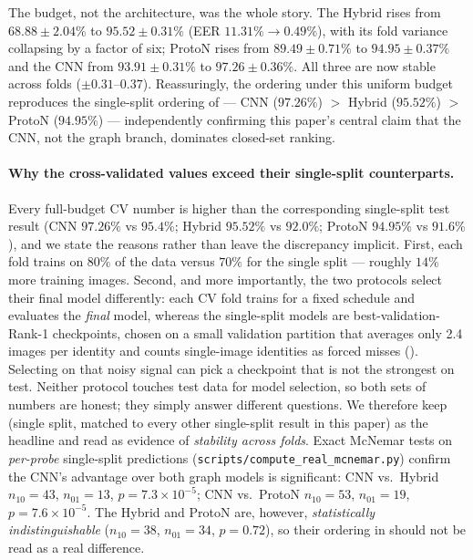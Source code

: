 \documentclass[11pt]{article}
\begin{document}
The budget, not the architecture, was the whole story. The Hybrid rises from
$68.88\pm2.04\%$ to $\mathbf{95.52\pm0.31\%}$ (EER $11.31\%\to\mathbf{0.49\%}$), with its
fold variance collapsing by a factor of six; ProtoN rises from $89.49\pm0.71\%$ to
$\mathbf{94.95\pm0.37\%}$ and the CNN from $93.91\pm0.31\%$ to $\mathbf{97.26\pm0.36\%}$.
All three are now stable across folds ($\pm0.31$--$0.37$). Reassuringly, the ordering under
this uniform budget reproduces the single-split ordering of  --- CNN
($97.26\%$) $>$ Hybrid ($95.52\%$) $>$ ProtoN ($94.95\%$) --- independently confirming this
paper's central claim that the CNN, not the graph branch, dominates closed-set ranking.

\paragraph{Why the cross-validated values exceed their single-split counterparts.} Every
full-budget CV number is higher than the corresponding single-split test result (CNN
$97.26\%$ vs $95.4\%$; Hybrid $95.52\%$ vs $92.0\%$; ProtoN $94.95\%$ vs $91.6\%$), and we
state the reasons rather than leave the discrepancy implicit. First, each fold trains on
$80\%$ of the data versus $70\%$ for the single split --- roughly $14\%$ more training
images. Second, and more importantly, the two protocols select their final model
differently: each CV fold trains for a fixed schedule and evaluates the \emph{final} model,
whereas the single-split models are best-validation-Rank-1 checkpoints, chosen on a small
validation partition that averages only 2.4 images per identity and counts single-image
identities as forced misses (). Selecting on that noisy signal can pick a
checkpoint that is not the strongest on test. Neither protocol touches test data for model
selection, so both sets of numbers are honest; they simply answer different questions. We
therefore keep  (single split, matched to every other single-split result in
this paper) as the headline and read  as evidence of \emph{stability across
folds}. Exact McNemar tests on \emph{per-probe} single-split predictions (\texttt{scripts/compute\_real\_mcnemar.py}) confirm the CNN's advantage over both graph models is significant: CNN vs.\ Hybrid $n_{10}{=}43$, $n_{01}{=}13$, $p{=}7.3\times10^{-5}$; CNN vs.\ ProtoN $n_{10}{=}53$, $n_{01}{=}19$, $p{=}7.6\times10^{-5}$. The Hybrid and ProtoN are, however, \emph{statistically indistinguishable} ($n_{10}{=}38$, $n_{01}{=}34$, $p{=}0.72$), so their ordering in  should not be read as a real difference.
\end{document}
